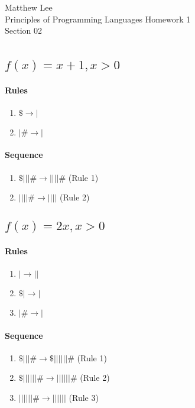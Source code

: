 \documentclass{article}
\begin{document}
\noindent
Matthew Lee\\
Principles of Programming Languages Homework 1\\
Section 02\\
\section{}
  \subsection{$f(x) = x + 1, x > 0$}
    \paragraph{Rules}
      \begin{enumerate}
        \item $\$ \rightarrow |$
        \item $|\# \rightarrow |$
      \end{enumerate}
    \paragraph{Sequence}
      \begin{enumerate}
        \item $\$|||\# \rightarrow ||||\#$ (Rule 1)
        \item $||||\# \rightarrow ||||$ (Rule 2)
      \end{enumerate}
  \subsection{$f(x) = 2x, x > 0$}
    \paragraph{Rules}
      \begin{enumerate}
        \item $| \rightarrow ||$
        \item $\$| \rightarrow |$
        \item $|\# \rightarrow |$
      \end{enumerate}
    \paragraph{Sequence}
      \begin{enumerate}
        \item $\$|||\# \rightarrow \$||||||\#$ (Rule 1)
        \item $\$||||||\# \rightarrow ||||||\#$ (Rule 2)
        \item $||||||\# \rightarrow ||||||$ (Rule 3)
      \end{enumerate}
\end{document}
